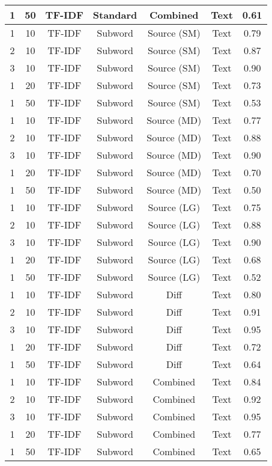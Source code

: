 \begin{longtable}{|c|c|c|c|c|c|c|}
\hline
1 & 50 & TF-IDF & Standard & Combined & Text & 0.61 \\
\hline
1 & 10 & TF-IDF & Subword & Source (SM) & Text & 0.79 \\
\hline
2 & 10 & TF-IDF & Subword & Source (SM) & Text & 0.87 \\
\hline
3 & 10 & TF-IDF & Subword & Source (SM) & Text & 0.90 \\
\hline
1 & 20 & TF-IDF & Subword & Source (SM) & Text & 0.73 \\
\hline
1 & 50 & TF-IDF & Subword & Source (SM) & Text & 0.53 \\
\hline
1 & 10 & TF-IDF & Subword & Source (MD) & Text & 0.77 \\
\hline
2 & 10 & TF-IDF & Subword & Source (MD) & Text & 0.88 \\
\hline
3 & 10 & TF-IDF & Subword & Source (MD) & Text & 0.90 \\
\hline
1 & 20 & TF-IDF & Subword & Source (MD) & Text & 0.70 \\
\hline
1 & 50 & TF-IDF & Subword & Source (MD) & Text & 0.50 \\
\hline
1 & 10 & TF-IDF & Subword & Source (LG) & Text & 0.75 \\
\hline
2 & 10 & TF-IDF & Subword & Source (LG) & Text & 0.88 \\
\hline
3 & 10 & TF-IDF & Subword & Source (LG) & Text & 0.90 \\
\hline
1 & 20 & TF-IDF & Subword & Source (LG) & Text & 0.68 \\
\hline
1 & 50 & TF-IDF & Subword & Source (LG) & Text & 0.52 \\
\hline
1 & 10 & TF-IDF & Subword & Diff & Text & 0.80 \\
\hline
2 & 10 & TF-IDF & Subword & Diff & Text & 0.91 \\
\hline
3 & 10 & TF-IDF & Subword & Diff & Text & 0.95 \\
\hline
1 & 20 & TF-IDF & Subword & Diff & Text & 0.72 \\
\hline
1 & 50 & TF-IDF & Subword & Diff & Text & 0.64 \\
\hline
1 & 10 & TF-IDF & Subword & Combined & Text & 0.84 \\
\hline
2 & 10 & TF-IDF & Subword & Combined & Text & 0.92 \\
\hline
3 & 10 & TF-IDF & Subword & Combined & Text & 0.95 \\
\hline
1 & 20 & TF-IDF & Subword & Combined & Text & 0.77 \\
\hline
1 & 50 & TF-IDF & Subword & Combined & Text & 0.65 \\

\end{longtable}
